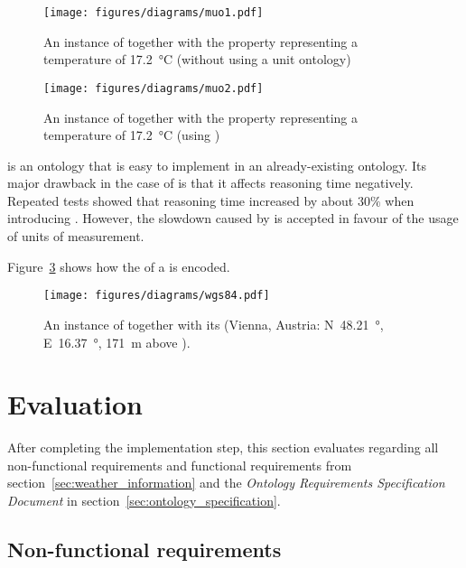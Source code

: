 \begin{figure}
  \centering
  \texttt{[image: figures/diagrams/muo1.pdf]}
  \caption{An instance of  together with the property  representing a temperature of \SI{17.2}{\celsius} (without using a unit ontology)}
  \label{fig:muo1}
\end{figure}

\begin{figure}
  \centering
  \texttt{[image: figures/diagrams/muo2.pdf]}
  \caption{An instance of  together with the property  representing a temperature of \SI{17.2}{\celsius} (using \muo)}
  \label{fig:muo2}
\end{figure}

\muo is an ontology that is easy to implement in an already-existing ontology. Its major drawback in the case of \smarthomeweather is that it affects reasoning time negatively. Repeated tests showed that reasoning time increased by about $30 \%$ when introducing \muo. However, the slowdown caused by \muo is accepted in favour of the usage of units of measurement.

\vspace{1em}

Figure~\ref{fig:owl_wgs84} shows how the  of a  is encoded. %

\begin{figure}
  \centering
  \texttt{[image: figures/diagrams/wgs84.pdf]}
  \caption{An instance of  together with its  (Vienna, Austria: N~\SI{48.21}{\degree}, E~\SI{16.37}{\degree}, \SI{171}{\metre} above ).}
  \label{fig:owl_wgs84}
\end{figure}

\section{Evaluation}
\label{sec:ontology_evaluation}

After completing the implementation step, this section evaluates \smarthomeweather regarding all non-functional requirements and functional requirements from section~\ref{sec:weather_information} and the \emph{Ontology Requirements Specification Document} in section~\ref{sec:ontology_specification}.

\subsection{Non-functional requirements}
\label{sec:evaluation_non_functional}

